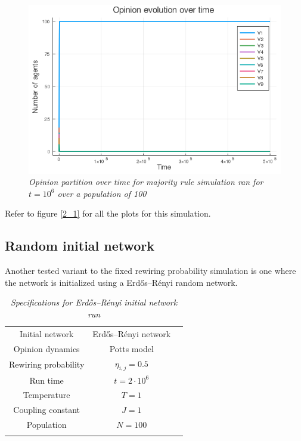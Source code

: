 \documentclass[12pt,openright,twoside]{book}
\begin{document}
\begin{figure}[!ht]
\centering
\includegraphics[width=0.65\linewidth]{figures/2_1/vote_evolution.png}
\caption{\textit{{\small Opinion partition over time for majority rule simulation ran for $t=10^6$ over a population of 100}}}
\label{2_1:partition}
\end{figure}

Refer to figure \ref{2_1} for all the plots for this simulation.

\subsection{Random initial network}

Another tested variant to the fixed rewiring probability simulation is one where the network is initialized using a 
Erdős–Rényi random network\cite{bollobas_bela_2004}.\\

\begin{table}[!ht]
\centering
\begin{small}
\caption{\textit{Specifications for Erdős–Rényi initial network run}}
\begin{tabular}{ccc}
\hline
Initial network             & Erdős–Rényi network\\
Opinion dynamics            & Potts model \\
Rewiring probability        & $\eta_{i,j}=0.5$\\
Run time                    & $t=2\cdot 10^6$\\
Temperature                 & $T=1$ \\
Coupling constant           & $J=1$ \\
Population                  & $N=100$\\
\hline
\label{er-specs}
\end{tabular}
\end{small}
\end{table}
\end{document}
